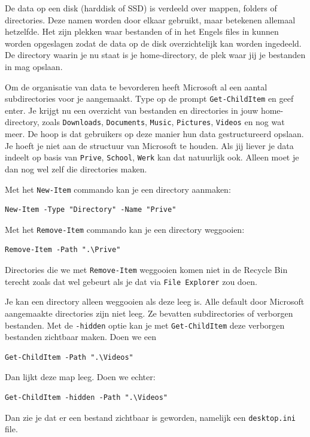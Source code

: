 De data op een disk (harddisk of SSD) is verdeeld over mappen, folders of directories. Deze namen worden door elkaar gebruikt, maar betekenen allemaal hetzelfde. Het zijn plekken waar bestanden of in het Engels files in kunnen worden opgeslagen zodat de data op de disk overzichtelijk kan worden ingedeeld. De directory waarin je nu staat is je home-directory, de plek waar jij je bestanden in mag opslaan.

Om de organisatie van data te bevorderen heeft Microsoft al een aantal subdirectories voor je aangemaakt. Type op de prompt \texttt{Get-ChildItem} en geef enter. Je krijgt nu een overzicht van bestanden en directories in jouw home-directory, zoals \texttt{Downloads}, \texttt{Documents}, \texttt{Music}, \texttt{Pictures}, \texttt{Videos} en nog wat meer. De hoop is dat gebruikers op deze manier hun data gestructureerd opslaan. Je hoeft je niet aan de structuur van Microsoft te houden. Als jij liever je data indeelt op basis van \texttt{Prive}, \texttt{School}, \texttt{Werk} kan dat natuurlijk ook. Alleen moet je dan nog wel zelf die directories maken.

Met het \texttt{New-Item} commando kan je een directory aanmaken:
\begin{lstlisting}[style=DOS]
New-Item -Type "Directory" -Name "Prive"
\end{lstlisting}

Met het \texttt{Remove-Item} commando kan je een directory weggooien:
\begin{lstlisting}[style=DOS]
Remove-Item -Path ".\Prive"
\end{lstlisting}
Directories die we met \texttt{Remove-Item} weggooien komen niet in de Recycle Bin terecht zoals dat wel gebeurt als je dat via \texttt{File Explorer} zou doen.

Je kan een directory alleen weggooien als deze leeg is. Alle default door Microsoft aangemaakte directories zijn niet leeg. Ze bevatten subdirectories of verborgen bestanden. Met de \texttt{-hidden} optie kan je met \texttt{Get-ChildItem} deze verborgen bestanden zichtbaar maken. Doen we een
\begin{lstlisting}[style=DOS]
Get-ChildItem -Path ".\Videos"
\end{lstlisting}
Dan lijkt deze map leeg. Doen we echter:
\begin{lstlisting}[style=DOS]
Get-ChildItem -hidden -Path ".\Videos"
\end{lstlisting}
Dan zie je dat er een bestand zichtbaar is geworden, namelijk een \texttt{desktop.ini} file.

